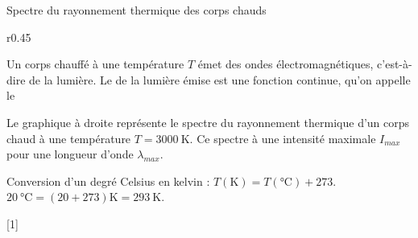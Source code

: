 

\newpage\vspace*{-36pt}
\begin{doc}{Spectre du rayonnement thermique des corps chauds}
  \begin{wrapfigure}[5]{r}{0.45\linewidth}
    \vspace*{-20pt}
    \centering
  \end{wrapfigure}
  \strut\vspace*{-22pt}
  
  \begin{importants}  
    Un corps chauffé à une température $T$ émet des ondes électromagnétiques, c'est-à-dire de la lumière.
    Le  de la lumière émise est une fonction continue, qu'on appelle le 
  \end{importants}

  Le graphique à droite représente le spectre du rayonnement thermique d'un corps chaud à une température $T = \qty{3000}{\kelvin}$.
  Ce spectre à une intensité maximale $I_{max}$ pour une longueur d'onde $\lambda_{max}$.
  \medskip

  \begin{importants}
    Conversion d'un degré Celsius en kelvin :
    $T(\unit{\kelvin}) = T(\unit{\degreeCelsius}) + 273$. 
    \exemple $\qty{20}{\degreeCelsius} = (20 + 273) \unit{\kelvin} = \qty{293}{\kelvin}$.
  \end{importants}
\end{doc}

[1]


